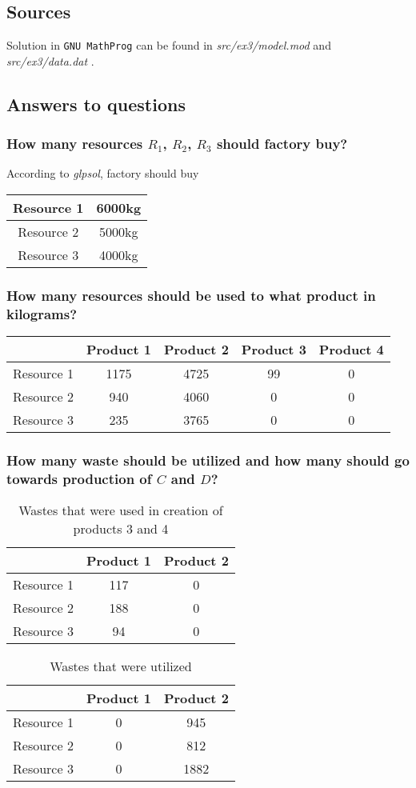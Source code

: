\subsection{Sources}
Solution in \texttt{GNU MathProg} can be found in \textit{src/ex3/model.mod} and \textit{src/ex3/data.dat} .

\subsection{Answers to questions}
\subsubsection*{How many resources $R_1$, $R_2$, $R_3$ should factory buy?}
According to \textit{glpsol}, factory should buy
\begin{table}[H]
    \centering
    \begin{tabular}{cc}
    Resource 1 & 6000kg \\ \hline
    Resource 2 & 5000kg \\ \hline
    Resource 3 & 4000kg
    \end{tabular}
\end{table}
\subsubsection*{How many resources should be used to what product in kilograms?}
\begin{table}[H]
    \centering
    \begin{tabular}{l|cccc}
        & Product 1 & Product 2 & Product 3 & Product 4 \\ \hline
    Resource 1 & 1175     & 4725      & 99        & 0         \\
    Resource 2 & 940       & 4060      & 0         & 0         \\
    Resource 3 & 235       & 3765      & 0         & 0        
    \end{tabular}

\end{table}
\subsubsection*{How many waste should be utilized and how many should go towards production of $C$ and $D$?}

\begin{table}[H]
    \centering
    \begin{tabular}{c|cc}
        & Product 1 & Product 2 \\ \hline
    Resource 1 & 117       & 0         \\
    Resource 2 & 188       & 0         \\
    Resource 3 & 94        & 0        
    \end{tabular}
    \caption{Wastes that were used in creation of products 3 and 4}
\end{table}

\begin{table}[H]
    \centering
    \begin{tabular}{c|cc}
        & Product 1 & Product 2 \\ \hline
    Resource 1 & 0       & 945         \\
    Resource 2 & 0       & 812       \\
    Resource 3 & 0        & 1882      
    \end{tabular}
    \caption{Wastes that were utilized}
\end{table}